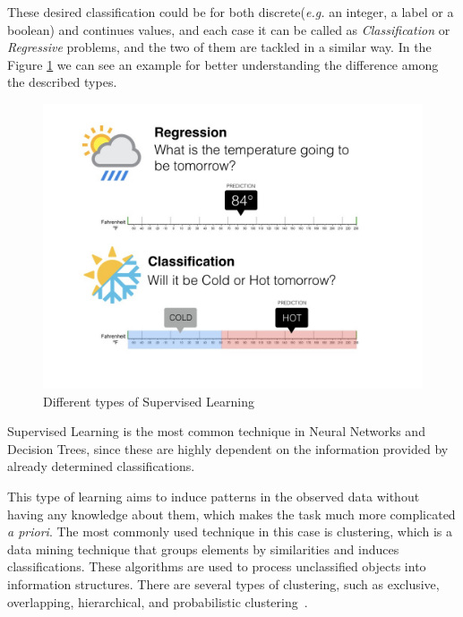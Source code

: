 These desired classification could be for both discrete(\textit{e.g.} an integer, a label or a boolean) and continues values, and each case it can be called as \textit{Classification} or \textit{Regressive} problems, and the two of them are tackled in a similar way. In the Figure \ref{fig:supervised-learning} we can see an example for better understanding the difference among the described types.

\begin{figure}[!h]
    \centering
    \includegraphics[scale=0.27]{img/state-of-art/supervised-learning.jpeg}
    \caption{Different types of Supervised Learning}
    \label{fig:supervised-learning}
\end{figure}

Supervised Learning is the most common technique in Neural Networks and Decision Trees, since these are highly dependent on the information provided by already determined classifications.

This type of learning aims to induce patterns in the observed data without having any knowledge about them, which makes the task much more complicated \textit{a priori}. The most commonly used technique in this case is clustering, which is a data mining technique that groups elements by similarities and induces classifications. These algorithms are used to process unclassified objects into information structures. There are several types of clustering, such as exclusive, overlapping, hierarchical, and probabilistic clustering~\cite{WhatisUn52:online}.

